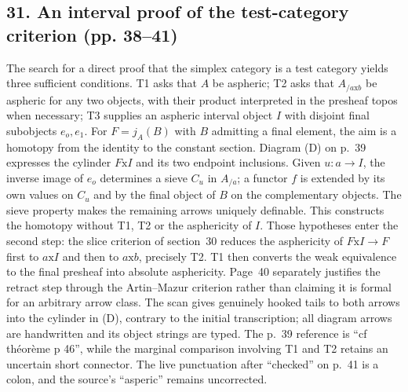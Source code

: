\documentclass[10pt,oneside]{book}
\begin{document}
\subsection*{31. An interval proof of the test-category criterion (pp. 38--41)}
The search for a direct proof that the simplex category is a test category yields three sufficient conditions. T1 asks that $A$ be aspheric; T2 asks that $A_{/a\mathrm{x}b}$ be aspheric for any two objects, with their product interpreted in the presheaf topos when necessary; T3 supplies an aspheric interval object $I$ with disjoint final subobjects $e_o,e_1$. For $F=j_A(B)$ with $B$ admitting a final element, the aim is a homotopy from the identity to the constant section. Diagram (D) on p.~39 expresses the cylinder $F\mathrm{x}I$ and its two endpoint inclusions. Given $u:a\to I$, the inverse image of $e_o$ determines a sieve $C_u$ in $A_{/a}$; a functor $f$ is extended by its own values on $C_u$ and by the final object of $B$ on the complementary objects. The sieve property makes the remaining arrows uniquely definable. This constructs the homotopy without T1, T2 or the asphericity of $I$. Those hypotheses enter the second step: the slice criterion of section~30 reduces the asphericity of $F\mathrm{x}I\to F$ first to $a\mathrm{x}I$ and then to $a\mathrm{x}b$, precisely T2. T1 then converts the weak equivalence to the final presheaf into absolute asphericity. Page~40 separately justifies the retract step through the Artin--Mazur criterion rather than claiming it is formal for an arbitrary arrow class. The scan gives genuinely hooked tails to both arrows into the cylinder in (D), contrary to the initial transcription; all diagram arrows are handwritten and its object strings are typed. The p.~39 reference is ``cf théorème p 46'', while the marginal comparison involving T1 and T2 retains an uncertain short connector. The live punctuation after ``checked'' on p.~41 is a colon, and the source's ``asperic'' remains uncorrected.
\end{document}
